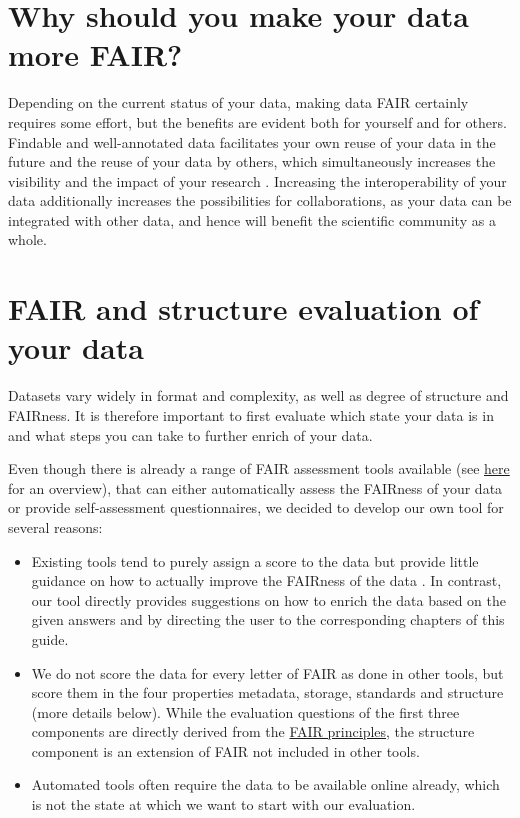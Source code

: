 \documentclass[
  oneside]{book}
\begin{document}
\section{Why should you make your data more FAIR?}\label{why-should-you-make-your-data-more-fair}

Depending on the current status of your data, making data FAIR certainly requires some effort, but the benefits are evident both for yourself and for others. Findable and well-annotated data facilitates your own reuse of your data in the future and the reuse of your data by others, which simultaneously increases the visibility and the impact of your research \autocite{McKiernan_2016}. Increasing the interoperability of your data additionally increases the possibilities for collaborations, as your data can be integrated with other data, and hence will benefit the scientific community as a whole.

\section{FAIR and structure evaluation of your data}\label{evaluation}

Datasets vary widely in format and complexity, as well as degree of structure and FAIRness. It is therefore important to first evaluate which state your data is in and what steps you can take to further enrich of your data.

Even though there is already a range of FAIR assessment tools available (see \href{https://fairassist.org/}{here} for an overview), that can either automatically assess the FAIRness of your data or provide self-assessment questionnaires, we decided to develop our own tool for several reasons:

\begin{itemize}
\item
  Existing tools tend to purely assign a score to the data but provide little guidance on how to actually improve the FAIRness of the data \autocite{Krans_2022}. In contrast, our tool directly provides suggestions on how to enrich the data based on the given answers and by directing the user to the corresponding chapters of this guide.
\item
  We do not score the data for every letter of FAIR as done in other tools, but score them in the four properties metadata, storage, standards and structure (more details below). While the evaluation questions of the first three components are directly derived from the \hyperref[what-is-fair]{FAIR principles}, the structure component is an extension of FAIR not included in other tools.
\item
  Automated tools often require the data to be available online already, which is not the state at which we want to start with our evaluation.
\end{itemize}
\end{document}
